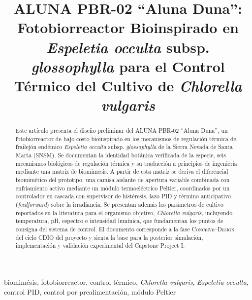 \documentclass[conference]{IEEEtran}
\begin{document}
\title{ALUNA PBR-02 ``Aluna Duna'': Fotobiorreactor Bioinspirado en\\
\textit{Espeletia occulta} subsp. \textit{glossophylla} para el Control\\
T\'ermico del Cultivo de \textit{Chlorella vulgaris}}

\author{
}

\maketitle

\begin{abstract}
Este art\'iculo presenta el dise\~no preliminar del ALUNA PBR-02 ``Aluna
Duna'', un fotobiorreactor de bajo costo bioinspirado en los mecanismos de
regulaci\'on t\'ermica del frailej\'on end\'emico \textit{Espeletia occulta}
subsp. \textit{glossophylla} de la Sierra Nevada de Santa Marta (SNSM). Se
documentan la identidad bot\'anica verificada de la especie, seis
mecanismos biol\'ogicos de regulaci\'on t\'ermica y su traducci\'on a
principios de ingenier\'ia mediante una matriz de biom\'imesis. A partir de
esta matriz se deriva el diferencial biomim\'etico del prototipo: una
camisa aislante de apertura variable combinada con enfriamiento activo
mediante un m\'odulo termoel\'ectrico Peltier, coordinados por un
controlador en cascada con supervisor de hist\'eresis, lazo PID y t\'ermino
anticipativo (\textit{feedforward}) sobre la irradiancia. Se presentan
adem\'as los par\'ametros de cultivo reportados en la literatura para el
organismo objetivo, \textit{Chlorella vulgaris}, incluyendo temperatura,
pH, espectro e intensidad lum\'inica, que fundamentan los puntos de
consigna del sistema de control. El documento corresponde a la fase
\textsc{Conceive}--\textsc{Design} del ciclo CDIO del proyecto y sienta la
base para la posterior simulaci\'on, implementaci\'on y validaci\'on experimental
del Capstone Project I.
\end{abstract}

\begin{IEEEkeywords}
biomim\'esis, fotobiorreactor, control t\'ermico, \textit{Chlorella
vulgaris}, \textit{Espeletia occulta}, control PID, control por
prealimentaci\'on, m\'odulo Peltier
\end{IEEEkeywords}
\end{document}
